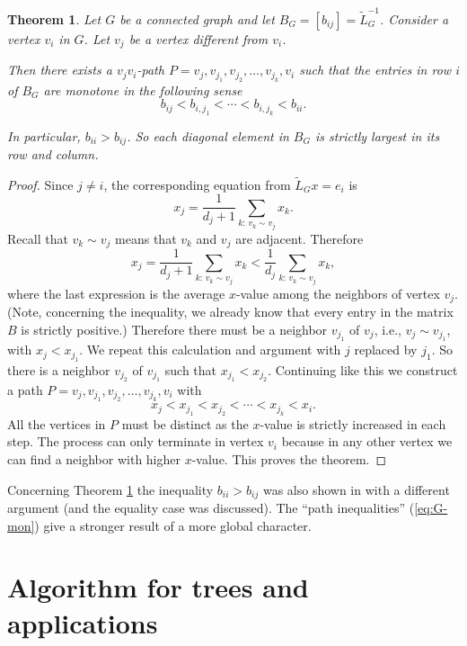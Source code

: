 \documentclass[12pt]{article}
\newtheorem{theorem}{Theorem}[section]
\begin{document}
\begin{theorem}
 \label{thm:G_B_monotone}
  Let $G$ be a connected graph and let $B_G=[b_{ij}]=\tilde{L}_G^{-1}$. Consider a vertex $v_i$ in $G$. Let $v_j$ be a vertex different from $v_i$. 
  
  Then there exists a $v_jv_i$-path $P=v_j, v_{j_1}, v_{j_2}, \ldots, v_{j_k}, v_i$ such that the entries in row $i$ of $B_G$ are monotone in the following sense 
  \begin{equation}
    \label{eq:G-mon}
      b_{ij} < b_{i,j_1} < \cdots < b_{i,j_k} < b_{ii}. 
  \end{equation}

 In particular, $b_{ii}>b_{ij}$. So each diagonal element in $B_G$ is strictly largest in its row and column.
\end{theorem}
%
\begin{proof}
 Since $j \not = i$, the corresponding equation from $\tilde{L}_G x=e_i$ is 
 \[
     x_j=\frac{1}{d_j+1}\sum_{k:\, v_k \sim v_j} x_k. 
 \]
 Recall that  $v_k \sim v_j$ means that $v_k$ and $v_j$ are adjacent. Therefore  
 \[
     x_j=\frac{1}{d_j+1}\sum_{k:\, v_k \sim v_j} x_k <\frac{1}{d_j}\sum_{k:\, v_k \sim v_j} x_k,
 \]
  where the last expression is the average $x$-value among the neighbors of vertex $v_j$. (Note, concerning the inequality, we already know that every entry in the matrix $B$ is strictly positive.) Therefore there must be a  neighbor $v_{j_1}$ of $v_j$, i.e., $v_j \sim v_{j_1}$, with $x_j<x_{j_1}$.
 We repeat this calculation and argument with $j$ replaced by $j_1$. So there is a neighbor $v_{j_2}$ of $v_{j_1}$ such that $x_{j_1}<x_{j_2}$. Continuing like this we construct a path $P=v_j, v_{j_1}, v_{j_2}, \ldots, v_{j_k}, v_i$ with
  \[
   x_j<x_{j_1} < x_{j_2} < \cdots < x_{j_k}<x_i.
  \]
   All the vertices in $P$ must be distinct as the $x$-value is strictly increased in each step. The process can only terminate in vertex $v_i$ because in any other vertex we can find a neighbor with higher $x$-value. This proves the theorem. 
\end{proof}

Concerning Theorem \ref{thm:G_B_monotone} the inequality $b_{ii}>b_{ij}$ was also shown in \cite[Theorem 2]{Merris_II}  with a different argument (and the equality case was discussed). The  ``path inequalities''  (\ref{eq:G-mon}) give a stronger result of a more global character. 


\section{Algorithm for trees and applications}
\label{sec:alg_tree}
\end{document}
